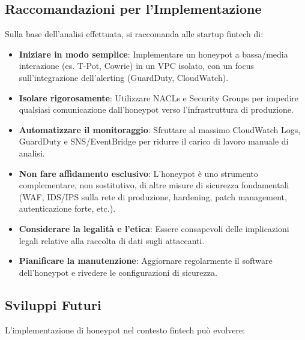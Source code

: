\documentclass[a4paper,12pt]{report}
\begin{document}
\subsection{Raccomandazioni per l'Implementazione}
\label{subsec:raccomandazioni}

Sulla base dell'analisi effettuata, si raccomanda alle startup fintech di:

\begin{itemize}
    \item \textbf{Iniziare in modo semplice}: Implementare un honeypot a bassa/media interazione (es. T-Pot, Cowrie) in un VPC isolato, con un focus sull'integrazione dell'alerting (GuardDuty, CloudWatch).
    \item \textbf{Isolare rigorosamente}: Utilizzare NACLs e Security Groups per impedire qualsiasi comunicazione dall'honeypot verso l'infrastruttura di produzione.
    \item \textbf{Automatizzare il monitoraggio}: Sfruttare al massimo CloudWatch Logs, GuardDuty e SNS/EventBridge per ridurre il carico di lavoro manuale di analisi.
    \item \textbf{Non fare affidamento esclusivo}: L'honeypot è uno strumento complementare, non sostitutivo, di altre misure di sicurezza fondamentali (WAF, IDS/IPS sulla rete di produzione, hardening, patch management, autenticazione forte, etc.).
    \item \textbf{Considerare la legalità e l'etica}: Essere consapevoli delle implicazioni legali relative alla raccolta di dati sugli attaccanti.
    \item \textbf{Pianificare la manutenzione}: Aggiornare regolarmente il software dell'honeypot e rivedere le configurazioni di sicurezza.
\end{itemize}

\subsection{Sviluppi Futuri}
\label{subsec:sviluppi_futuri}

L'implementazione di honeypot nel contesto fintech può evolvere:
\end{document}
